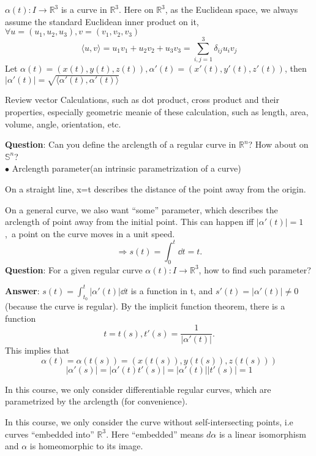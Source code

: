  
$\alpha(t)\colon I\to \mathbb{R}^3$ is a curve in $\mathbb{R}^3$. Here on $\mathbb{R}^3$, as the Euclidean space, we always assume the standard Euclidean inner product on it, \ie\ $\forall u=(u_1,u_2,u_3),v=(v_1,v_2,v_3)$
\[\langle u,v\rangle=u_1 v_1+u_2 v_2+ u_3 v_3=\sum_{i,j=1}^3\delta_{ij}u_i v_j\]
Let $\alpha(t)=(x(t),y(t),z(t)),\alpha'(t)=(x'(t),y'(t),z'(t))$, then $\left|\alpha'(t)\right|=\sqrt{\langle\alpha'(t),\alpha'(t)\rangle}$
\begin{exercise}
    Review vector Calculations, such as dot product, cross product and their properties, especially geometric meanie of these calculation, such as length, area, volume, angle, orientation, etc.
\end{exercise}
\noindent
\textbf{Question}: Can you define the arclength of a regular curve in $\mathbb{R}^n$? How about on $\mathbb{S}^n$? \\
$\bullet$ Arclength parameter(an intrinsic parametrization of a curve)
\begin{example}
On a straight line, x=t describes the distance of the point away from the origin.
\begin{center}
\end{center}
\end{example}
On a general curve, we also want ``some'' parameter, which describes the arclength of point away from the initial point. This can happen iff $|\alpha'(t)|=1$,\ie\ a point on the curve moves in a unit speed.
\[\Rightarrow s(t)=\int_0^t \dd t=t.\]
\textbf{Question}: For a given regular curve $\alpha(t)\colon I\to \mathbb{R}^3$, how to find such parameter?

\noindent 
\textbf{Answer}: $s(t)=\int_{t_0}^t \left|\alpha'(t)\right|\dd t$ is a function in t, and $s'(t)=\left|\alpha'(t)\right|\neq 0$(because the curve is regular). By the implicit function theorem, there is a function 
\[
    t=t(s),t'(s)=\frac{1}{\left|\alpha'(t)\right|}.
\]
This implies that 
\[
    \alpha(t)=\alpha(t(s))=(x(t(s)),y(t(s)),z(t(s)))
\]
\[
    \left|\alpha'(s)\right|=\left|\alpha'(t)t'(s)\right|=\left|\alpha'(t)\right|\left|t'(s)\right|=1
\]

 In this course, we only consider differentiable regular curves, which are parametrized by the arclength (for convenience).
\begin{remark}
    In this course, we only consider the curve without self-intersecting points, i.e curves ``embedded into'' $\mathbb{R}^3$. Here ``embedded'' means $d\alpha$ is a linear isomorphism and $\alpha$ is homeomorphic to its image.
\end{remark}
